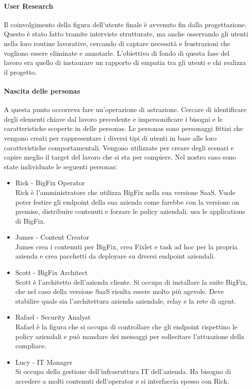\paragraph{User Research}
Il coinvolgimento della figura dell'utente finale è avvenuto fin dalla progettazione. Questo è stato fatto tramite interviste strutturate, ma anche osservando gli utenti nella loro routine lavorative, cercando di captare necessità e frustrazioni che vogliono essere eliminate e annotarle. L'obiettivo di fondo di questa fase del lavoro era quello di instaurare un rapporto di empatia tra gli utenti e chi realizza il progetto.

\paragraph{Nascita delle personas}
A questa punto occorreva fare un'operazione di astrazione. Cercare di identificare degli elementi chiave dal lavoro precedente e impersonificare i bisogni e le caratteristiche scoperte in delle personas. Le personas sono personaggi fittizi che vengono creati per rappresentare i diversi tipi di utenti in base alle loro caratteristiche comportamentali. Vengono utilizzate per creare degli scenari e capire meglio il target del lavoro che si sta per compiere. Nel nostro caso sono state individuate le seguenti personas:
\begin{itemize}
	\item Rick - BigFix Operator \\
	Rick è l'amministratore che utilizza BigFix nella sua versione SaaS. Vuole poter festire gli endpoint della sua azienda come farebbe con la versione on premise, distribuire contenuti e forzare le policy aziendali. usa le applications di BigFix.
	\item James - Content Creator \\
	James crea i contenuti per BigFix, crea Fixlet e task ad hoc per la propria azienda e crea pacchetti da deployare su diversi endpoint aziendali.
	\item Scott - BigFix Architect \\
	Scott è l'architetto dell'azienda cliente. Si occupa di installare la suite BigFix, che nel caso della versione SaaS risulta essere molto più agevole. Deve stabilire quale sia l'architettura azienda aziendale, relay e la rete di agent.
	\item  Rafael - Security Analyst \\
	Rafael è la figura che si occupa di controllare che gli endpoint rispettino le policy aziendali e può mandare dei messaggi per sollecitare l'attuazione della compliace.
	\item Lucy - IT Manager \\
	Si occupa della gestione dell'infrasruttura IT dell'azienda. Ha bisogno di accedere a molti contenuti dell'operator e si interfaccia spesso con Rick.
\end{itemize}

